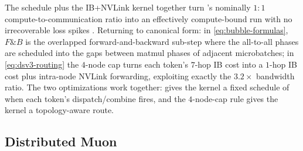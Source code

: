 \begin{intuition}
The  schedule plus the IB+NVLink kernel together turn
's nominally $1{:}1$ compute-to-communication ratio
\citep[\S 3.2.1]{deepseek-v3} into an effectively compute-bound run
with no irrecoverable loss spikes \citep[abstract]{deepseek-v3}.
Returning to canonical form: in \cref{eq:bubble-formulas}, $F\mathbin{\text{\&}}B$ is
the overlapped forward-and-backward sub-step where the all-to-all
phases are scheduled into the gaps between matmul phases of adjacent
microbatches; in \cref{eq:dsv3-routing} the $4$-node cap turns each
token's $7$-hop IB cost into a $1$-hop IB cost plus intra-node NVLink
forwarding, exploiting exactly the $3.2\times$ bandwidth ratio. The
two optimizations work together:  gives the kernel a fixed
schedule of when each token's dispatch/combine fires, and the
$4$-node-cap rule gives the kernel a topology-aware route.
\end{intuition}

\subsection{Distributed Muon}
\label{sec:dt-muon}

